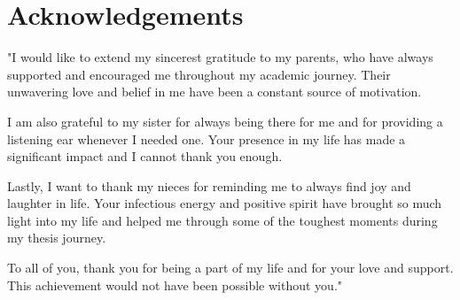 \chapter*{Acknowledgements}


"I would like to extend my sincerest gratitude to my parents, who have always supported and encouraged me throughout my academic journey. Their unwavering love and belief in me have been a constant source of motivation.

I am also grateful to my sister for always being there for me and for providing a listening ear whenever I needed one. Your presence in my life has made a significant impact and I cannot thank you enough.

Lastly, I want to thank my nieces for reminding me to always find joy and laughter in life. Your infectious energy and positive spirit have brought so much light into my life and helped me through some of the toughest moments during my thesis journey.

To all of you, thank you for being a part of my life and for your love and support. This achievement would not have been possible without you."
